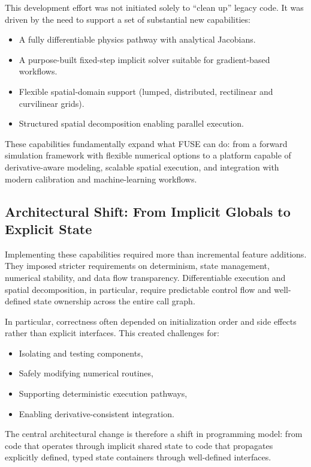 \documentclass[11pt]{scrartcl}
\begin{document}
This development effort was not initiated solely to ``clean up'' legacy code.
It was driven by the need to support a set of substantial new capabilities:

\begin{itemize}
\item A fully differentiable physics pathway with analytical Jacobians.
\item A purpose-built fixed-step implicit solver suitable for gradient-based workflows.
\item Flexible spatial-domain support (lumped, distributed, rectilinear and curvilinear grids).
\item Structured spatial decomposition enabling parallel execution.
\end{itemize}

These capabilities fundamentally expand what FUSE can do: from a forward
simulation framework with flexible numerical options to a platform capable of
derivative-aware modeling, scalable spatial execution, and integration with
modern calibration and machine-learning workflows.

\subsection{Architectural Shift: From Implicit Globals to Explicit State}

Implementing these capabilities required more than incremental feature additions.
They imposed stricter requirements on determinism, state management, numerical
stability, and data flow transparency. Differentiable execution and spatial
decomposition, in particular, require predictable control flow and well-defined
state ownership across the entire call graph.

In particular, correctness often depended on initialization order and
side effects rather than explicit interfaces. This created challenges for:

\begin{itemize}
\item Isolating and testing components,
\item Safely modifying numerical routines,
\item Supporting deterministic execution pathways,
\item Enabling derivative-consistent integration.
\end{itemize}

The central architectural change is therefore a shift in programming model:
from code that operates through implicit shared state to code that
propagates explicitly defined, typed state containers through well-defined
interfaces.
\end{document}
